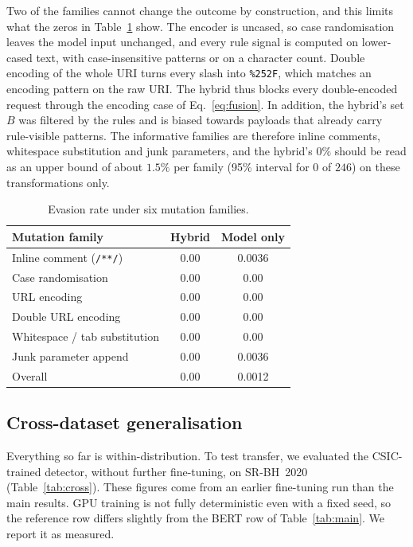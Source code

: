 \documentclass[preprint,11pt]{elsarticle}
\let\footnotesize\normalsize
\begin{document}
Two of the families cannot change the outcome by construction, and this
limits what the zeros in Table~\ref{tab:adv} show. The encoder is uncased,
so case randomisation leaves the model input unchanged, and every rule
signal is computed on lower-cased text, with case-insensitive patterns or
on a character count. Double encoding of the whole URI turns every slash
into \texttt{\%252F}, which matches an encoding pattern on the raw URI. The
hybrid thus blocks every double-encoded request through the encoding case
of Eq.~\eqref{eq:fusion}. In addition, the hybrid's set $B$ was filtered by
the rules and is biased towards payloads that already carry rule-visible
patterns. The informative families are therefore inline comments,
whitespace substitution and junk parameters, and the hybrid's $0\%$ should
be read as an upper bound of about $1.5\%$ per family (95\% interval for
$0$ of $246$) on these transformations only.

\begin{table}[t]
\centering
\footnotesize
\caption{Evasion rate under six mutation families.}
\label{tab:adv}
\begin{tabular}{@{}lcc@{}}
\toprule
Mutation family & Hybrid & Model only \\
\midrule
Inline comment (\texttt{/**/}) & 0.00 & 0.0036 \\
Case randomisation             & 0.00 & 0.00 \\
URL encoding                   & 0.00 & 0.00 \\
Double URL encoding            & 0.00 & 0.00 \\
Whitespace / tab substitution  & 0.00 & 0.00 \\
Junk parameter append          & 0.00 & 0.0036 \\
Overall                        & 0.00 & 0.0012 \\
\bottomrule
\end{tabular}
\end{table}

\subsection{Cross-dataset generalisation}
\label{sec:crossdataset}
Everything so far is within-distribution. To test transfer, we evaluated
the CSIC-trained detector, without further fine-tuning, on
SR-BH~2020~\cite{srbh2020} (Table~\ref{tab:cross}). These figures come from
an earlier fine-tuning run than the main results. GPU training is not fully
deterministic even with a fixed seed, so the reference row differs slightly
from the BERT row of Table~\ref{tab:main}. We report it as measured.
\end{document}
